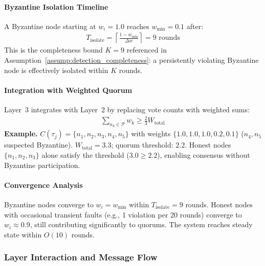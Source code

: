 \documentclass[manuscript,screen,review]{acmart}
\begin{document}
\paragraph{Byzantine Isolation Timeline}

A Byzantine node starting at $w_i = 1.0$ reaches $w_{\min} = 0.1$ after:
\begin{equation}
\begin{aligned}
T_{\text{isolate}} = \left\lceil \frac{1 - w_{\min}}{\Delta w}
\right\rceil = 9 \text{ rounds}
\label{eq:isolation_time}
\end{aligned}
\end{equation}
This is the completeness bound $K = 9$ referenced in Assumption~\ref{assump:detection_completeness}: a persistently violating Byzantine node is effectively isolated within $K$ rounds.

\paragraph{Integration with Weighted Quorum}

Layer~3 integrates with Layer~2 by replacing vote counts with weighted sums:
\begin{equation}
\begin{aligned}
\sum_{n_k \in \mathcal{P}} w_k \geq \frac{2}{3} W_{\text{total}}
\label{eq:weighted_threshold}
\end{aligned}
\end{equation}
\textbf{Example.} $C(\tau_j) = \{n_1, n_2, n_3, n_4, n_5\}$ with weights $\{1.0, 1.0, 1.0, 0.2, 0.1\}$ ($n_4, n_5$ suspected Byzantine). $W_{\text{total}} = 3.3$; quorum threshold: $2.2$. Honest nodes $\{n_1, n_2, n_3\}$ alone satisfy the threshold ($3.0 \geq 2.2$), enabling consensus without Byzantine participation.

\paragraph{Convergence Analysis}

Byzantine nodes converge to $w_i = w_{\min}$ within $T_{\text{isolate}} = 9$ rounds. Honest nodes with occasional transient faults (e.g., 1 violation per 20 rounds) converge to $w_i \approx 0.9$, still contributing significantly to quorums. The system reaches steady state within $O(10)$ rounds.

\subsubsection{Layer Interaction and Message Flow}
\label{sec:layer_interaction}
\end{document}

